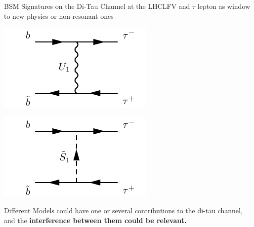 \documentclass{../bredelebeamer}
\begin{document}
\begin{frame}{BSM Signatures on the Di-Tau Channel at the LHC}{LFV and $\tau$ lepton as window to new physics}
	\vfill%
	or non-resonant ones

	\begin{minipage}{.45\linewidth}
		\begin{center}
			\includegraphics[width=.9\linewidth]{non-res_vector.pdf}
		\end{center}
	\end{minipage}
	\hfill
	\begin{minipage}{.45\linewidth}
		\begin{center}
			\includegraphics[width=.9\linewidth]{non-res_scalar.pdf}
		\end{center}
	\end{minipage}
  \begin{center}
		{ \large
		Different Models could have one or several contributions to the di-tau channel, and the \textbf{interference between them could be relevant.}
		}
	\end{center}
\end{frame}
\end{document}
